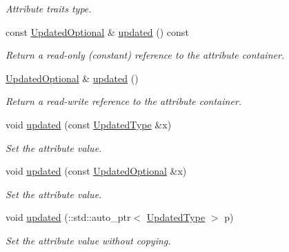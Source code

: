 \begin{DoxyCompactItemize}
\begin{DoxyCompactList}\small\item\em Attribute traits type. \item\end{DoxyCompactList}\item 
const \hyperlink{classopenstack_1_1xml_1_1Image_a21b65ba75912c63ba7bc5718fa2df9d2}{UpdatedOptional} \& \hyperlink{classopenstack_1_1xml_1_1Image_a0024308eb1e9a624cb1b5505ab1cb932}{updated} () const 
\begin{DoxyCompactList}\small\item\em Return a read-\/only (constant) reference to the attribute container. \item\end{DoxyCompactList}\item 
\hyperlink{classopenstack_1_1xml_1_1Image_a21b65ba75912c63ba7bc5718fa2df9d2}{UpdatedOptional} \& \hyperlink{classopenstack_1_1xml_1_1Image_a61a9ebf05a5e9382315402a5006fd183}{updated} ()
\begin{DoxyCompactList}\small\item\em Return a read-\/write reference to the attribute container. \item\end{DoxyCompactList}\item 
void \hyperlink{classopenstack_1_1xml_1_1Image_ad3cc0017204a4045c90e8a00ba5aaa99}{updated} (const \hyperlink{classopenstack_1_1xml_1_1Image_aa24ab3c61a5b2ca0b4a715ce25689491}{UpdatedType} \&x)
\begin{DoxyCompactList}\small\item\em Set the attribute value. \item\end{DoxyCompactList}\item 
void \hyperlink{classopenstack_1_1xml_1_1Image_acf40420be3c85ee2bc597a296858eba3}{updated} (const \hyperlink{classopenstack_1_1xml_1_1Image_a21b65ba75912c63ba7bc5718fa2df9d2}{UpdatedOptional} \&x)
\begin{DoxyCompactList}\small\item\em Set the attribute value. \item\end{DoxyCompactList}\item 
void \hyperlink{classopenstack_1_1xml_1_1Image_af6836bd33f700b1cb90a8ca516c0d31d}{updated} (::std::auto\_\-ptr$<$ \hyperlink{classopenstack_1_1xml_1_1Image_aa24ab3c61a5b2ca0b4a715ce25689491}{UpdatedType} $>$ p)
\begin{DoxyCompactList}\small\item\em Set the attribute value without copying. \item\end{DoxyCompactList}\end{DoxyCompactItemize}
